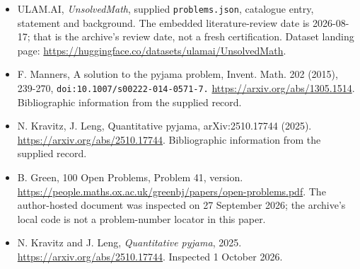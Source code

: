 \documentclass[11pt,a4paper]{article}
\begin{document}
{\small

\begin{itemize}

\item[\hypertarget{source:statement:1}{S1}] ULAM.AI, \emph{UnsolvedMath}, supplied \texttt{problems.json}, catalogue entry, statement and background. The embedded literature-review date is 2026-08-17; that is the archive’s review date, not a fresh certification. Dataset landing page: \url{https://huggingface.co/datasets/ulamai/UnsolvedMath}.

\item[\hypertarget{source:statement:2}{S2}] F. Manners, A solution to the pyjama problem, Invent. Math. 202 (2015), 239-270, \nolinkurl{doi:10.1007/s00222-014-0571-7.} \url{https://arxiv.org/abs/1305.1514}. Bibliographic information from the supplied record.

\item[\hypertarget{source:statement:3}{S3}] N. Kravitz, J. Leng, Quantitative pyjama, arXiv:2510.17744 (2025). \url{https://arxiv.org/abs/2510.17744}. Bibliographic information from the supplied record.

\item[\hypertarget{source:statement:4}{S4}] B. Green, 100 Open Problems, Problem 41, version. \url{https://people.maths.ox.ac.uk/greenbj/papers/open-problems.pdf}. The author-hosted document was inspected on 27 September 2026; the archive’s local code is not a problem-number locator in this paper.

\item[E1] N. Kravitz and J. Leng, \emph{Quantitative pyjama}, 2025. \url{https://arxiv.org/abs/2510.17744}. Inspected 1 October 2026.

\end{itemize}

}

\label{end:statement}
\end{document}
